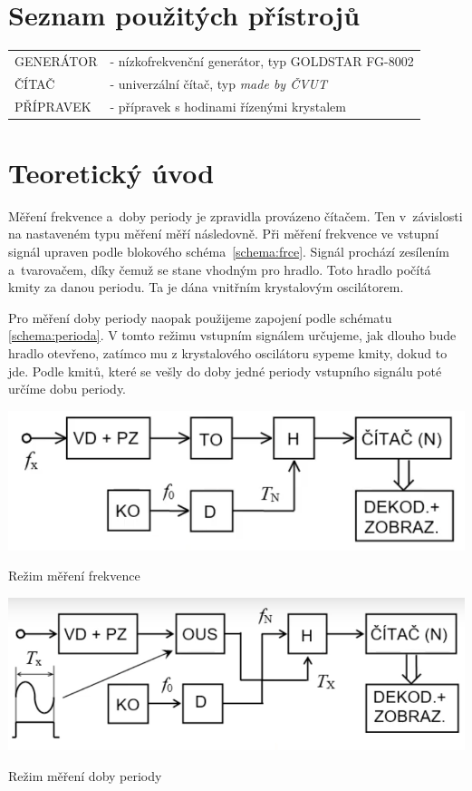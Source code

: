 \documentclass[a4paper,12pt]{article}   %
\begin{document}
\section{Seznam použitých přístrojů}
\begin{table}[h!]
  \begin{tabular}{ll}
    GENERÁTOR &- nízkofrekvenční generátor, typ GOLDSTAR FG-8002\\
    ČÍTAČ &- univerzální čítač, typ \textit{made by ČVUT}\\
    PŘÍPRAVEK &- přípravek s hodinami řízenými krystalem\\
  \end{tabular}
\end{table}
\section{Teoretický úvod}
Měření frekvence a~doby periody je zpravidla provázeno čítačem. Ten v~závislosti na nastaveném typu měření měří následovně. Při měření frekvence ve vstupní signál upraven podle blokového schéma~\ref{schema:frce}. Signál prochází zesílením a~tvarovačem, díky čemuž se stane vhodným pro hradlo. Toto hradlo počítá kmity za danou periodu. Ta je dána vnitřním krystalovým oscilátorem.

Pro měření doby periody naopak použijeme zapojení podle schématu \ref{schema:perioda}. V tomto režimu vstupním signálem určujeme, jak dlouho bude hradlo otevřeno, zatímco mu z krystalového oscilátoru sypeme kmity, dokud to jde. Podle kmitů, které se vešly do doby jedné periody vstupního signálu poté určíme dobu periody.
\begin{schema}[h!]
  \centering
  \includegraphics[width=.6\textwidth]{frce.png}
  \caption{Režim měření frekvence}
  \label{schema:frce}
\end{schema}

\begin{schema}[h!]
  \centering
  \includegraphics[width=.6\textwidth]{perioda.png}
  \caption{Režim měření doby periody}
  \label{schema:perioda}
\end{schema}
\end{document}

